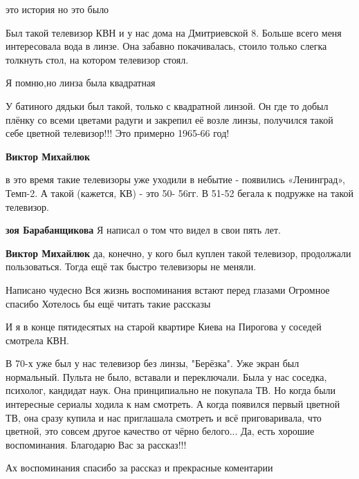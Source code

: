 \begin{itemize}
это история но это было


Был такой телевизор КВН и у нас дома на Дмитриевской 8. Больше всего меня
интересовала вода в линзе. Она забавно покачивалась, стоило только слегка
толкнуть стол, на котором телевизор стоял.

Я помню,но линза была квадратная


У батиного дядьки был такой, только с квадратной линзой. Он где то добыл плёнку
со всеми цветами радуги и закрепил её возле линзы, получился такой себе цветной
телевизор!!! Это примерно 1965-66 год!

\begin{itemize} %
\textbf{Виктор Михайлюк} 

в это время такие телевизоры уже уходили в небытие - появились «Ленинград»,
Темп-2. А такой (кажется, КВ) - это 50- 56гг. В 51-52 бегала к подружке на
такой телевизор.

\begin{itemize} %
\textbf{зоя Барабанщикова} Я написал о том что видел в свои пять лет.

\textbf{Виктор Михайлюк} да, конечно, у кого был куплен такой телевизор, продолжали пользоваться. Тогда ещё так быстро телевизоры не меняли.
\end{itemize} %

\end{itemize} %

Написано чудесно Вся жизнь воспоминания встают перед глазами Огромное спасибо Хотелось бы ещё читать такие рассказы

И я в конце пятидесятых на старой квартире Киева на Пирогова у соседей смотрела КВН.


В 70-х уже был у нас телевизор без линзы, "Берёзка". Уже экран был нормальный.
Пульта не было, вставали и переключали. Была у нас соседка, психолог, кандидат
наук. Она принципиально не покупала ТВ. Но когда были интересные сериалы ходила
к нам смотреть. А когда появился первый цветной ТВ, она сразу купила и нас
приглашала смотреть и всё приговаривала, что цветной, это совсем другое
качество от чёрно белого... Да, есть хорошие воспоминания. Благодарю Вас за
рассказ!!!

Ах воспоминания спасибо за рассказ и прекрасные коментарии


\end{itemize} %
